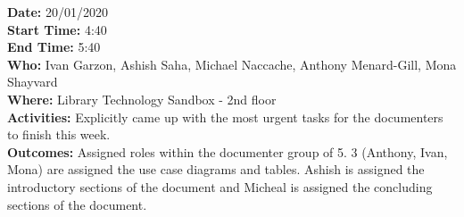 \documentclass[12pt]{article}
\begin{document}
{\bf Date:} 20/01/2020\\
{\bf Start Time:} 4:40\\
{\bf End Time:} 5:40\\
{\bf Who:} Ivan Garzon, Ashish Saha, Michael Naccache, Anthony Menard-Gill, Mona Shayvard \\
{\bf Where:} Library Technology Sandbox - 2nd floor \\
{\bf Activities:} Explicitly came up with the most urgent tasks for the documenters to finish this week.\\
{\bf Outcomes:} Assigned roles within the documenter group of 5. 3 (Anthony, Ivan, Mona) are assigned the use case diagrams and tables. Ashish is assigned the introductory sections of the document and Micheal is assigned the concluding sections of the document. \\


\end{document}
